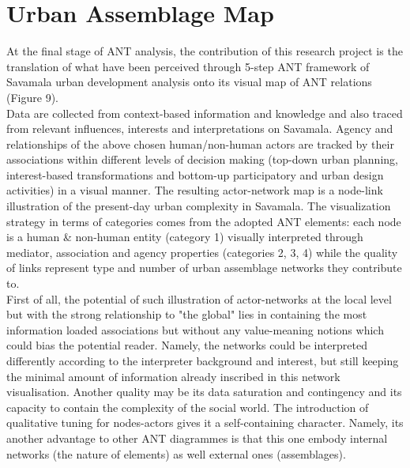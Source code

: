 \documentclass[11pt]{report}
\begin{document}

\section{Urban Assemblage Map}

At the final stage of ANT analysis, the contribution of this research project is the translation of what have been perceived through 5-step ANT framework of Savamala urban development analysis onto its visual map of ANT relations  (Figure 9). 
\\
Data are collected from context-based information and knowledge and also traced from relevant influences, interests and interpretations on Savamala.
Agency and relationships of the above chosen human/non-human actors are tracked by their associations within different levels of decision making (top-down urban planning, interest-based transformations and bottom-up participatory and urban design activities) in a visual manner.
The resulting actor-network map is a node-link illustration of the present-day urban complexity in Savamala.
The visualization strategy in terms of categories comes from the adopted ANT elements: each node is a human \& non-human entity (category 1) visually interpreted through mediator, association and agency properties (categories 2, 3, 4) while the quality of links represent type and number of urban assemblage networks they contribute to.
\\
First of all, the potential of such illustration of actor-networks at the local level but with the strong relationship to "the global" lies in containing the most information loaded associations but without any value-meaning notions which could bias the potential reader. Namely, the networks could be interpreted differently according to the interpreter background and interest, but still keeping the minimal amount of information already inscribed in this network visualisation.
Another quality may be its data saturation and contingency and its capacity to contain the complexity of the social world.
The introduction of qualitative tuning for nodes-actors gives it a self-containing character. Namely, its another advantage to other ANT diagrammes is that this one embody internal  networks (the nature of elements) as well external ones (assemblages).
\end{document}
